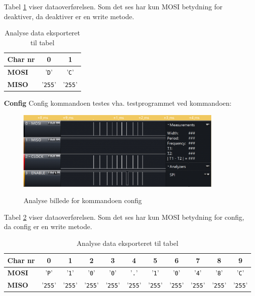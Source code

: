 Tabel \ref{table:scop_deactivate} viser dataoverførelsen. Som det ses har kun MOSI betydning for deaktiver, da deaktiver er en write metode. 

\begin{table}[h]
	\caption{Analyse data eksporteret til tabel}
	\centering
	\begin{tabular}{|l|c|c|}
		\hline 
		\textbf{Char nr} & \textbf{0} & \textbf{1} \\ 		
		\hline 
		\textbf{MOSI} & '\verb+D+' & '\verb+C+' \\ 
		\hline 
		\textbf{MISO} & '\verb+255+' & '\verb+255+' \\ 
		\hline 
	\end{tabular} 
	\label{table:scop_deactivate}
\end{table}


\textbf{Config}
Config kommandoen testes vha. testprogrammet ved kommandoen: 


\begin{figure}[H]
\centering
{\includegraphics[width=0.90\textwidth]{filer/integrationstest/billeder/spi_config}}
\caption{Analyse billede for kommandoen config}
\label{lab:scop_config}
\end{figure}

Tabel \ref{table:scop_config} viser dataoverførelsen. Som det ses har kun MOSI betydning for config, da config er en write metode. 

\begin{table}[H]
	\caption{Analyse data eksporteret til tabel}
	\centering
	\begin{tabular}{|l|c|c|c|c|c|c|c|c|c|c|}
		\hline 
		\textbf{Char nr} & \textbf{0} & \textbf{1} & \textbf{2} & \textbf{3} & \textbf{4} & \textbf{5} 
						 & \textbf{6} & \textbf{7} & \textbf{8} & \textbf{9}\\ 		
		\hline 
		\textbf{MOSI} & '\verb+P+' & '\verb+1+' & '\verb+0+' & '\verb+0+' & '\verb+.+' & '\verb+1+' 
						& '\verb+0+' & '\verb+4+' & '\verb+8+' & '\verb+C+' \\ 
		\hline 
		\textbf{MISO} & '\verb+255+' & '\verb+255+' & '\verb+255+' & '\verb+255+' & '\verb+255+' & '\verb+255+' 
						& '\verb+255+' & '\verb+255+' & '\verb+255+' & '\verb+255+' \\ 
		\hline 
	\end{tabular} 
	\label{table:scop_config}
\end{table}


